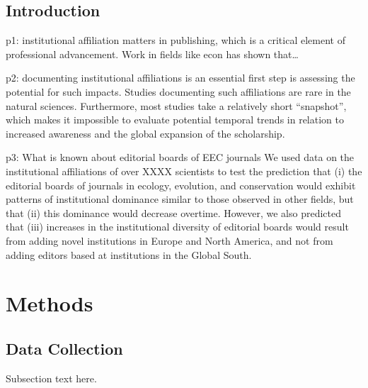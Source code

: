 \documentclass[]{rsos}%
\begin{document}
\begin{fmtext}

\hypertarget{introduction}{%
\section{Introduction}\label{introduction}}

p1: institutional affiliation matters in publishing, which is a critical element of professional advancement. Work in fields like econ has shown that\ldots{}

\citep{addisEditorialBoardsItalian2003}
\citep{hodgsonEditorsAuthorsEconomics1999}
p2: documenting institutional affiliations is an essential first step is assessing the potential for such impacts. Studies documenting such affiliations are rare in the natural sciences. Furthermore, most studies take a relatively short ``snapshot'', which makes it impossible to evaluate potential temporal trends in relation to increased awareness and the global expansion of the scholarship.

p3: What is known about editorial boards of EEC journals We used data on the institutional affiliations of over XXXX scientists to test the prediction that (i) the editorial boards of journals in ecology, evolution, and conservation would exhibit patterns of institutional dominance similar to those observed in other fields, but that (ii) this dominance would decrease overtime. However, we also predicted that (iii) increases in the institutional diversity of editorial boards would result from adding novel institutions in Europe and North America, and not from adding editors based at institutions in the Global South.

\end{fmtext}
\maketitle

\hypertarget{methods}{%
\section{Methods}\label{methods}}

\hypertarget{data-collection}{%
\subsection{Data Collection}\label{data-collection}}

Subsection text here.
\end{document}
